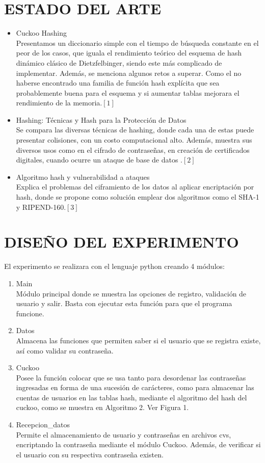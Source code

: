 \documentclass[final,a4paper,twocolumn,romanappendices]{IEEEtran}
\begin{document}
\section{ESTADO DEL ARTE}

\begin{itemize}
\item
Cuckoo Hashing\\
Presentamos un diccionario simple con el tiempo de b\'usqueda constante en el peor de los casos, que iguala el rendimiento te\'orico del esquema de hash din\'amico  cl\'asico de Dietzfelbinger, siendo este m\'as complicado de implementar. Adem\'as, se menciona algunos retos a superar. Como el no haberse encontrado una familia de funci\'on hash expl\'icita que sea probablemente buena para el esquema y si aumentar tablas mejorara el rendimiento de la memoria.$[1]$
\item
Hashing: Técnicas y Hash para la Protección de Datos \\
Se compara las diversas técnicas de hashing, donde cada una de estas puede presentar colisiones, con un costo computacional alto. Además, muestra sus diversos  usos  como en el cifrado de contraseñas, en creación de certificados digitales, cuando ocurre un ataque de base de datos .$[2]$

\item
Algoritmo hash y vulnerabilidad a ataques\\
Explica el problemas del ciframiento de los datos al aplicar encriptación por hash, donde se propone como solución emplear dos algoritmos como el SHA-1 y RIPEND-160.$[3]$
\end{itemize}


\section{DISEÑO DEL EXPERIMENTO}
El experimento se realizara con el lenguaje python creando 4 módulos:
\begin{enumerate}
    \item Main \\
    Módulo principal donde se muestra las opciones de registro, validación de usuario y salir. Basta con ejecutar esta función para que el programa funcione.
    \item Datos\\
    Almacena las funciones que permiten saber si el usuario que se registra existe, así como validar su contraseña.
    \item Cuckoo\\
     Posee la funci\'on colocar que se usa tanto para desordenar las contrase\~nas ingresadas en forma de una sucesi\'on de car\'acteres, como para almacenar las cuentas de usuarios en las tablas hash, mediante el algoritmo del hash del cuckoo, como se muestra en Algoritmo 2.  Ver Figura 1.
     \item Recepcion\_datos\\
     Permite el almacenamiento de usuario y contraseñas en archivos cvs, encriptando la contraseña mediante el módulo Cuckoo. Además, de verificar si el usuario con su respectiva contraseña existen.
\end{enumerate}
\end{document}
